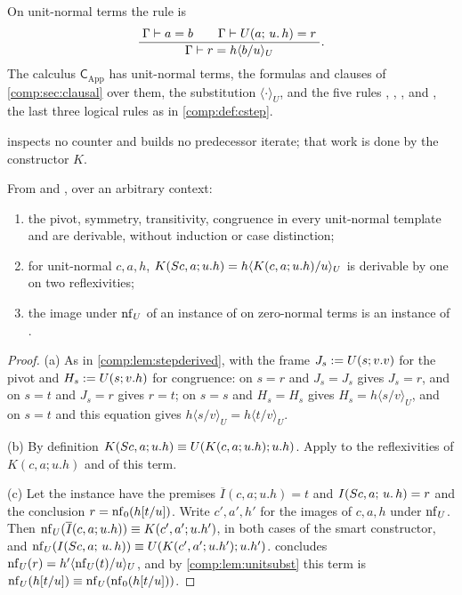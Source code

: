\begin{definition}
\label{comp:def:app}
On unit-normal terms the rule  is
\[
 \dfrac{\;\Gamma\vdash a=b\qquad\Gamma\vdash U(a;\,u.\,h)=r\;}{\;\Gamma\vdash r=h\langle b/u\rangle_U\;}.
\]
The calculus $\mathsf{C}_{\mathrm{App}}$ has unit-normal terms, the formulas
and clauses of \cref{comp:sec:clausal} over them, the substitution
$\langle\cdot\rangle_U$, and the five rules , ,
,  and , the last three logical
rules as in \cref{comp:def:cstep}.
\end{definition}

 inspects no counter and builds no predecessor iterate; that
work is done by the constructor $K$.

\begin{lemma}
\label{comp:lem:appderived}
From  and , over an arbitrary context:
\begin{enumerate}[label=(\alph*)]
\item the pivot, symmetry, transitivity, congruence in every unit-normal
 template and  are derivable, without induction or case
 distinction;
\item for unit-normal $c,a,h$,
 $K(S c,a;u.h)=h\langle K(c,a;u.h)/u\rangle_U$ is derivable by one
  on two reflexivities;
\item the image under $\operatorname{nf}_U$ of an instance of  on
 zero-normal terms is an instance of .
\end{enumerate}
\end{lemma}

\begin{proof}
(a) As in \cref{comp:lem:stepderived}, with the frame
$J_s\mathrel{:=} U(s;v.v)$ for the pivot and $H_s\mathrel{:=} U(s;v.h)$ for congruence:
 on $s=r$ and $J_s=J_s$ gives $J_s=r$, and  on
$s=t$ and $J_s=r$ gives $r=t$;  on $s=s$ and $H_s=H_s$ gives
$H_s=h\langle s/v\rangle_U$, and  on $s=t$ and this equation
gives $h\langle s/v\rangle_U=h\langle t/v\rangle_U$.

(b) By definition $K(S c,a;u.h)\equiv U(K(c,a;u.h);u.h)$. Apply
 to the reflexivities of $K(c,a;u.h)$ and of this term.

(c) Let the instance have the premises $\overline{I}(c,a;u.h)=t$ and
$I(S c,a;\,u.\,h)=r$ and the conclusion $r=\operatorname{nf}_0(h[t/u])$. Write
$c',a',h'$ for the images of $c,a,h$ under $\operatorname{nf}_U$. Then
$\operatorname{nf}_U(\overline{I}(c,a;u.h))\equiv K(c',a';u.h')$, in both cases of the
smart constructor, and
$\operatorname{nf}_U(I(S c,a;\,u.\,h))\equiv U(K(c',a';u.h');u.h')$. 
concludes $\operatorname{nf}_U(r)=h'\langle\operatorname{nf}_U(t)/u\rangle_U$, and by
\cref{comp:lem:unitsubst} this term is
$\operatorname{nf}_U(h[t/u])\equiv\operatorname{nf}_U(\operatorname{nf}_0(h[t/u]))$.
\end{proof}

